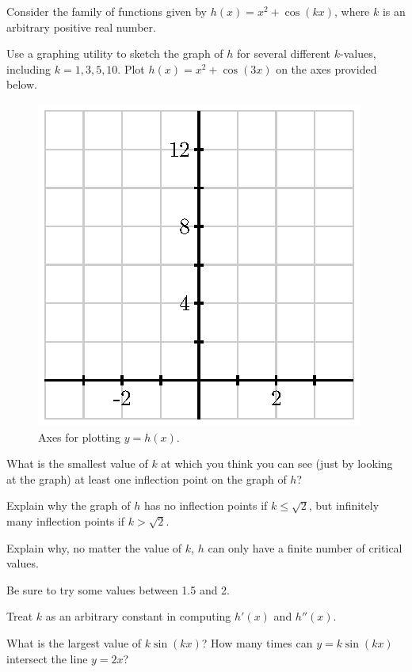 \begin{activity} \label{A:3.1.3}  
Consider the family of functions given by $h(x) = x^2 + \cos(kx)$, where $k$ is an arbitrary positive real number.
	\ba
	  \item Use a graphing utility to sketch the graph of $h$ for several different $k$-values, including $k = 1,3,5,10$.  Plot $h(x) = x^2 + \cos(3x)$ on the axes provided below.  
\begin{figure}[h]
\begin{center}
\includegraphics{figures/3_1_Act3.eps} 
\end{center}
\caption{Axes for plotting $y = h(x)$.} \label{F:3.1.Act3}
\end{figure}
	  What is the smallest value of $k$ at which you think you can see (just by looking at the graph) at least one inflection point on the graph of $h$?
	  \item Explain why the graph of $h$ has no inflection points if $k \le \sqrt{2}$, but infinitely many inflection points if $k > \sqrt{2}$.
	  \item Explain why, no matter the value of $k$, $h$ can only have a finite number of critical values.
	\ea
\end{activity}
\begin{smallhint}
	\ba
		\item Be sure to try some values between 1.5 and 2.
		\item Treat $k$ as an arbitrary constant in computing $h'(x)$ and $h''(x)$.  
		\item What is the largest value of $k\sin(kx)$?  How many times can $y = k\sin(kx)$ intersect the line $y = 2x$?
	\ea
\end{smallhint}
